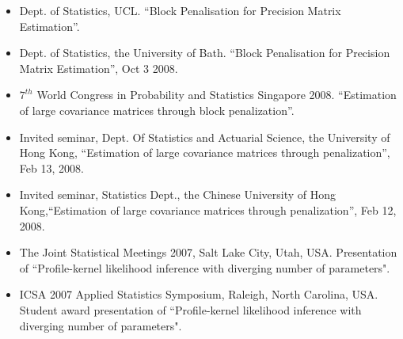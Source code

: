 \documentclass[overlapped,line,letterpaper]{res}
\begin{document}
\begin{resume}
\begin{itemize}
\item[$\bullet$] Dept. of Statistics, UCL. ``Block Penalisation for Precision Matrix
Estimation''.\\

\item[$\bullet$] Dept. of Statistics, the University of Bath. ``Block Penalisation for Precision Matrix
Estimation'', Oct 3 2008.\\

\item[$\bullet$]  $7^{th}$ World Congress in Probability and
Statistics Singapore 2008. ``Estimation of large covariance matrices
through block penalization''.\\

\item[$\bullet$] Invited seminar, Dept. Of Statistics and Actuarial Science, the University of Hong Kong, ``Estimation of large covariance matrices through penalization'', Feb 13, 2008.\\

\item[$\bullet$] Invited seminar, Statistics Dept., the Chinese University of Hong Kong,``Estimation of large covariance matrices through penalization'', Feb 12, 2008.\\


\item[$\bullet$] The Joint Statistical Meetings 2007, Salt Lake City, Utah, USA.
   Presentation of  ``Profile-kernel likelihood inference with diverging number of
   parameters".\\

\item[$\bullet$] ICSA 2007 Applied Statistics Symposium, Raleigh, North Carolina,
USA.
Student award presentation of  ``Profile-kernel likelihood inference with diverging number of
parameters".\\
\end{itemize}




\end{resume}
\end{document}
